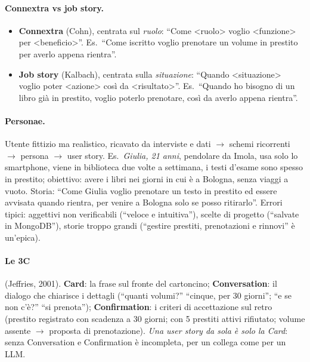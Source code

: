 \documentclass[a4paper,12pt]{article}
\begin{document}
\paragraph{Connextra vs job story.}
\begin{itemize}
  \item \textbf{Connextra} (Cohn), centrata sul \emph{ruolo}: ``Come \textless ruolo\textgreater{}
        voglio \textless funzione\textgreater{} per \textless beneficio\textgreater''. Es.\
        ``Come iscritto voglio prenotare un volume in prestito per averlo appena rientra''.
  \item \textbf{Job story} (Kalbach), centrata sulla \emph{situazione}: ``Quando
        \textless situazione\textgreater{} voglio poter \textless azione\textgreater{} così da
        \textless risultato\textgreater''. Es.\ ``Quando ho bisogno di un libro già in
        prestito, voglio poterlo prenotare, così da averlo appena rientra''.
\end{itemize}

\paragraph{Personae.} Utente fittizio ma realistico, ricavato da interviste e dati $\to$
schemi ricorrenti $\to$ persona $\to$ user story. Es.\ \emph{Giulia, 21 anni}, pendolare da
Imola, usa solo lo smartphone, viene in biblioteca due volte a settimana, i testi d'esame
sono spesso in prestito; obiettivo: avere i libri nei giorni in cui è a Bologna, senza viaggi
a vuoto. Storia: ``Come Giulia voglio prenotare un testo in prestito ed essere avvisata quando
rientra, per venire a Bologna solo se posso ritirarlo''. Errori tipici: aggettivi non
verificabili (``veloce e intuitiva''), scelte di progetto (``salvate in MongoDB''), storie
troppo grandi (``gestire prestiti, prenotazioni e rinnovi'' è un'epica).

\paragraph{Le 3C} (Jeffries, 2001). \textbf{Card}: la frase sul fronte del cartoncino;
\textbf{Conversation}: il dialogo che chiarisce i dettagli (``quanti volumi?'' ``cinque, per
30 giorni''; ``e se non c'è?'' ``si prenota''); \textbf{Confirmation}: i criteri di
accettazione sul retro (prestito registrato con scadenza a 30 giorni; con 5 prestiti attivi
rifiutato; volume assente $\to$ proposta di prenotazione). \emph{Una user story da sola è solo
la Card}: senza Conversation e Confirmation è incompleta, per un collega come per un LLM.
\end{document}
